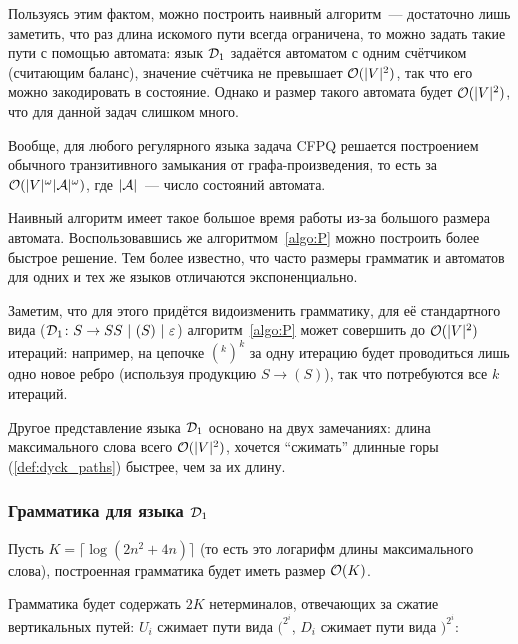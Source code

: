 \begin{note}
  Пользуясь этим фактом, можно построить наивный алгоритм~--- достаточно лишь заметить, что раз длина искомого пути всегда ограничена, то можно задать такие пути с помощью автомата: язык $\mathcal{D}_1$ задаётся автоматом с одним счётчиком (считающим баланс), значение счётчика не превышает $\mathcal{O}(|V|^2)$, так что его можно закодировать в состояние. Однако и размер такого автомата будет $\mathcal{O}(|V|^2)$, что для данной задач слишком много.
\end{note} 

\begin{note}\label{fact:regular_cfpq}
  Вообще, для любого регулярного языка задача CFPQ решается построением обычного транзитивного замыкания от графа-произведения, то есть за $\mathcal{O}(|V|^{\omega} |\mathcal{A}|^{\omega})$, где $|\mathcal{A}|$~--- число состояний автомата.
\end{note}

Наивный алгоритм имеет такое большое время работы из-за большого размера автомата. Воспользовавшись же алгоритмом~\ref{algo:P} можно построить более быстрое решение. Тем более известно, что часто размеры грамматик и автоматов для одних и тех же языков отличаются экспоненциально.

Заметим, что для этого придётся видоизменить грамматику, для её стандартного вида ($\mathcal{D}_1 \colon S \rightarrow SS~|~( S )~|~\varepsilon$) алгоритм~\ref{algo:P} может совершить до $\mathcal{O}(|V|^2)$ итераций: например, на цепочке $(^k )^k$ за одну итерацию будет проводиться лишь одно новое ребро (используя продукцию $S \to ( S )$), так что потребуются все $k$ итераций.

Другое представление языка $\mathcal{D}_1$ основано на двух замечаниях: длина максимального слова всего $\mathcal{O}(|V|^2)$, хочется ``сжимать'' длинные горы (\ref{def:dyck_paths}) быстрее, чем за их длину.

\subsubsection{Грамматика для языка $\mathcal{D}_1$}

Пусть $K = \lceil \log (2 n^2 + 4n) \rceil$ (то есть это логарифм длины максимального слова), построенная грамматика будет иметь размер $\mathcal{O}(K)$.

Грамматика будет содержать $2K$ нетерминалов, отвечающих за сжатие вертикальных путей: $U_i$ сжимает пути вида $(^{2^i}$, $D_i$ сжимает пути вида $)^{2^i}$:

\vspace{-20pt}

